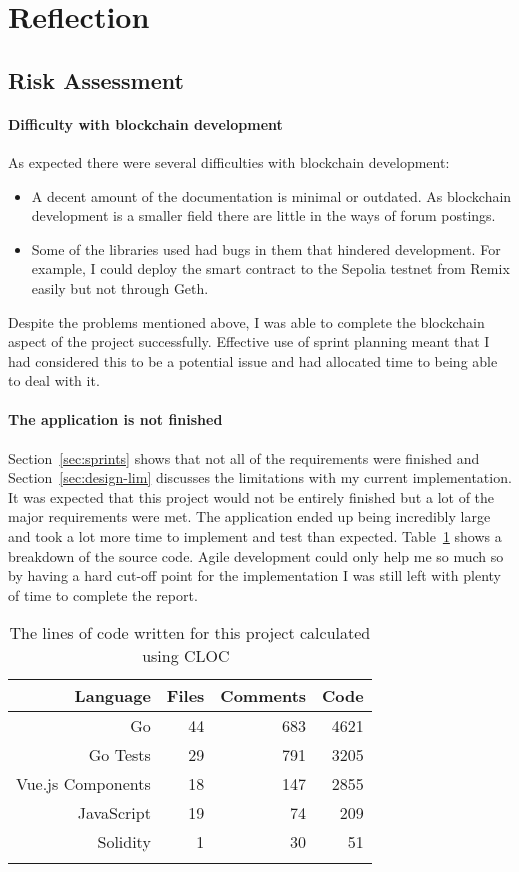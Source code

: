\section{Reflection}

\subsection*{Risk Assessment}

\paragraph*{Difficulty with blockchain development}
As expected there were several difficulties with blockchain development:

\begin{itemize}
  \item A decent amount of the documentation is minimal or outdated. As blockchain development is a smaller field there are little in the ways of forum postings.
  \item Some of the libraries used had bugs in them that hindered development. For example, I could deploy the smart contract to the Sepolia testnet from Remix easily but not through Geth. 
\end{itemize}

\newparagraph
Despite the problems mentioned above, I was able to complete the blockchain aspect of the project successfully. Effective use of sprint planning meant that I had considered this to be a potential issue and had allocated time to being able to deal with it.

\paragraph*{The application is not finished}
Section~\ref{sec:sprints} shows that not all of the requirements were finished and Section~\ref{sec:design-lim} discusses the limitations with my current implementation. It was expected that this project would not be entirely finished but a lot of the major requirements were met.
\x
The application ended up being incredibly large and took a lot more time to implement and test than expected. Table~\ref{tab:cloc} shows a breakdown of the source code. Agile development could only help me so much so by having a hard cut-off point for the implementation I was still left with plenty of time to complete the report.

\begin{longtable}{ r r r r }
  \toprule
  \textbf{Language} & \textbf{Files} & \textbf{Comments} & \textbf{Code}
  \\\midrule\midrule
  Go
  & 44
  & 683
  & 4621
  \\
  Go Tests
  & 29
  & 791
  & 3205
  \\
  Vue.js Components
  & 18
  & 147
  & 2855
  \\
  JavaScript
  & 19
  & 74
  & 209
  \\
  Solidity
  & 1
  & 30
  & 51
  \\\bottomrule\bottomrule
  \caption{The lines of code written for this project calculated using CLOC~\cite{noauthor_aldanialcloc_nodate}}
  \label{tab:cloc}
\end{longtable}

